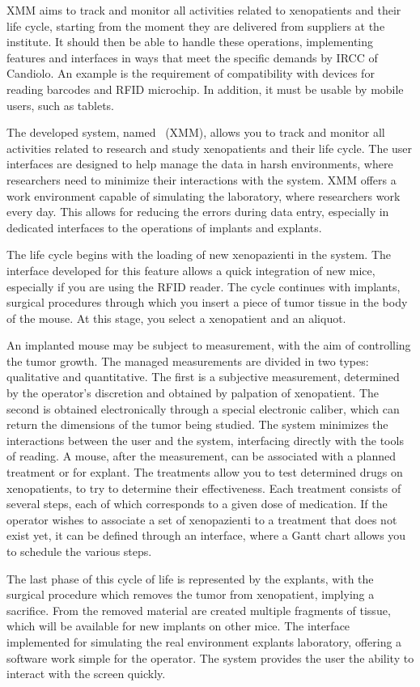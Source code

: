 XMM aims to track and monitor all activities related to xenopatients and their life cycle, starting from the moment they are delivered from suppliers at the institute. It should then be able to handle these operations, implementing features and interfaces in ways that meet the specific demands by IRCC of Candiolo. An example is the requirement of compatibility with devices for reading barcodes and RFID microchip. In addition, it must be usable by mobile users, such as tablets.

The developed system, named \Xeno\ (XMM), allows you to track and monitor all activities related to research and study xenopatients and their life cycle. The user interfaces are designed to help manage the data in harsh environments, where researchers need to minimize their interactions with the system. XMM offers a work environment capable of simulating the laboratory, where researchers work every day. This allows for reducing the errors during data entry, especially in dedicated interfaces to the operations of implants and explants.

The life cycle begins with the loading of new xenopazienti in the system. The interface developed for this feature allows a quick integration of new mice, especially if you are using the RFID reader. The cycle continues with implants, surgical procedures through which you insert a piece of tumor tissue in the body of the mouse. At this stage, you select a xenopatient and an aliquot.

An implanted mouse may be subject to measurement, with the aim of controlling the tumor growth. The managed measurements are divided in two types: qualitative and quantitative. The first is a subjective measurement, determined by the operator's discretion and obtained by palpation of xenopatient. The second is obtained electronically through a special electronic caliber, which can return the dimensions of the tumor being studied. The system minimizes the interactions between the user and the system, interfacing directly with the tools of reading. A mouse, after the measurement, can be associated with a planned treatment or for explant. The treatments allow you to test determined drugs on xenopatients, to try to determine their effectiveness. Each treatment consists of several steps, each of which corresponds to a given dose of medication. If the operator wishes to associate a set of xenopazienti to a treatment that does not exist yet, it can be defined through an interface, where a Gantt chart allows you to schedule the various steps.

The last phase of this cycle of life is represented by the explants, with the surgical procedure which removes the tumor from xenopatient, implying a sacrifice. From the removed material are created multiple fragments of tissue, which will be available for new implants on other mice. The interface implemented for simulating the real environment explants laboratory, offering a software work simple for the operator. The system provides the user the ability to interact with the screen quickly.